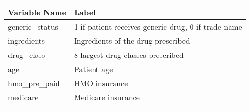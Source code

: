 \documentclass[
]{book}
\begin{document}
\begin{longtable}[]{@{}ll@{}}
\toprule
\begin{minipage}[b]{0.18\columnwidth}\raggedright
Variable Name\strut
\end{minipage} & \begin{minipage}[b]{0.76\columnwidth}\raggedright
Label\strut
\end{minipage}\tabularnewline
\midrule
\endhead
\begin{minipage}[t]{0.18\columnwidth}\raggedright
generic\_status\strut
\end{minipage} & \begin{minipage}[t]{0.76\columnwidth}\raggedright
1 if patient receives generic drug, 0 if trade-name\strut
\end{minipage}\tabularnewline
\begin{minipage}[t]{0.18\columnwidth}\raggedright
ingredients\strut
\end{minipage} & \begin{minipage}[t]{0.76\columnwidth}\raggedright
Ingredients of the drug prescribed\strut
\end{minipage}\tabularnewline
\begin{minipage}[t]{0.18\columnwidth}\raggedright
drug\_class\strut
\end{minipage} & \begin{minipage}[t]{0.76\columnwidth}\raggedright
8 largest drug classes prescribed\strut
\end{minipage}\tabularnewline
\begin{minipage}[t]{0.18\columnwidth}\raggedright
age\strut
\end{minipage} & \begin{minipage}[t]{0.76\columnwidth}\raggedright
Patient age\strut
\end{minipage}\tabularnewline
\begin{minipage}[t]{0.18\columnwidth}\raggedright
hmo\_pre\_paid\strut
\end{minipage} & \begin{minipage}[t]{0.76\columnwidth}\raggedright
HMO insurance\strut
\end{minipage}\tabularnewline
\begin{minipage}[t]{0.18\columnwidth}\raggedright
medicare\strut
\end{minipage} & \begin{minipage}[t]{0.76\columnwidth}\raggedright
Medicare insurance\strut
\end{minipage}\tabularnewline
\begin{minipage}[t]{0.18\columnwidth}\raggedright

\end{minipage}
\end{longtable}
\end{document}
